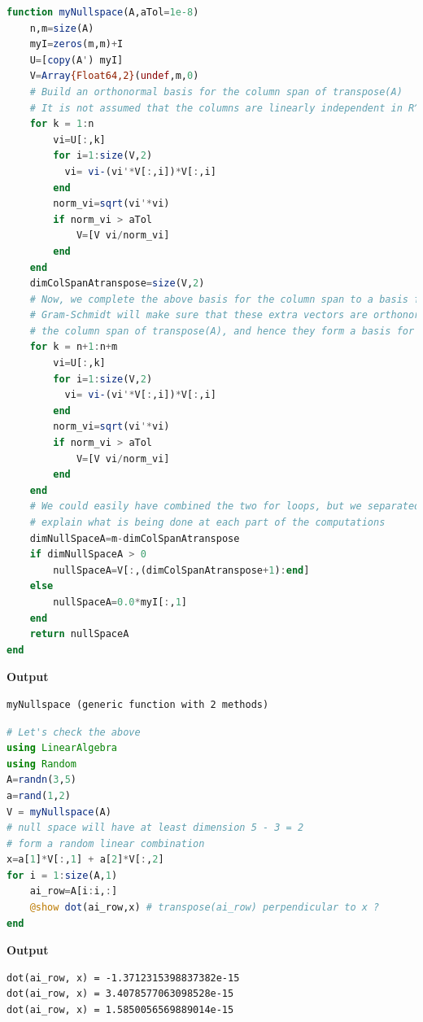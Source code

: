 
\begin{lstlisting}[language=Julia,style=mystyle]
function myNullspace(A,aTol=1e-8)
    n,m=size(A)
    myI=zeros(m,m)+I
    U=[copy(A') myI]
    V=Array{Float64,2}(undef,m,0)
    # Build an orthonormal basis for the column span of transpose(A)  
    # It is not assumed that the columns are linearly independent in R^m
    for k = 1:n
        vi=U[:,k]
        for i=1:size(V,2)
          vi= vi-(vi'*V[:,i])*V[:,i]
        end
        norm_vi=sqrt(vi'*vi)
        if norm_vi > aTol
            V=[V vi/norm_vi]
        end            
    end
    dimColSpanAtranspose=size(V,2)
    # Now, we complete the above basis for the column span to a basis for all of R^m. 
    # Gram-Schmidt will make sure that these extra vectors are orthonormal to 
    # the column span of transpose(A), and hence they form a basis for null space of A
    for k = n+1:n+m
        vi=U[:,k]
        for i=1:size(V,2)
          vi= vi-(vi'*V[:,i])*V[:,i]
        end
        norm_vi=sqrt(vi'*vi)
        if norm_vi > aTol
            V=[V vi/norm_vi]
        end            
    end
    # We could easily have combined the two for loops, but we separated them so we could
    # explain what is being done at each part of the computations
    dimNullSpaceA=m-dimColSpanAtranspose
    if dimNullSpaceA > 0
        nullSpaceA=V[:,(dimColSpanAtranspose+1):end]
    else
        nullSpaceA=0.0*myI[:,1]
    end
    return nullSpaceA
end
\end{lstlisting}
\textbf{Output} 
\begin{verbatim}
myNullspace (generic function with 2 methods)
\end{verbatim}

\begin{lstlisting}[language=Julia,style=mystyle]
# Let's check the above
using LinearAlgebra
using Random
A=randn(3,5)
a=rand(1,2)
V = myNullspace(A)
# null space will have at least dimension 5 - 3 = 2
# form a random linear combination
x=a[1]*V[:,1] + a[2]*V[:,2]
for i = 1:size(A,1)
    ai_row=A[i:i,:]
    @show dot(ai_row,x) # transpose(ai_row) perpendicular to x ?
end
\end{lstlisting}
\textbf{Output} 
\begin{verbatim}
dot(ai_row, x) = -1.3712315398837382e-15
dot(ai_row, x) = 3.4078577063098528e-15
dot(ai_row, x) = 1.5850056569889014e-15
\end{verbatim}




